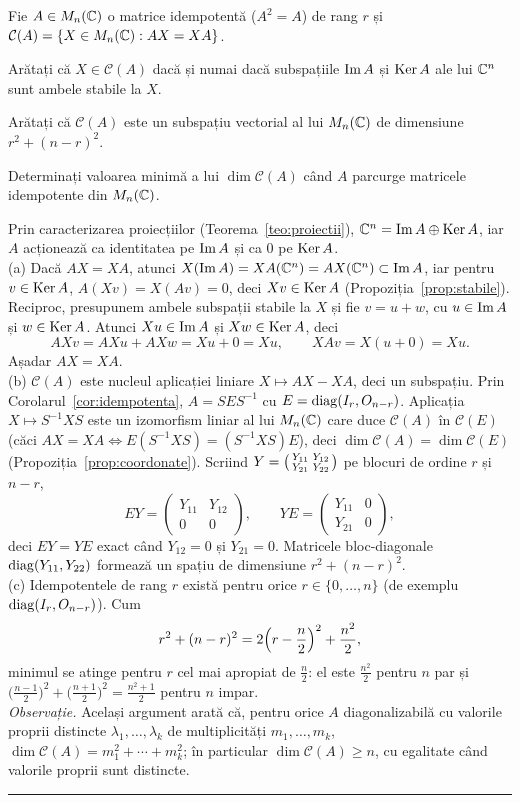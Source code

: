 Fie $A\in M_n(\mathbb{C})$ o matrice idempotentă ($A^2=A$) de rang $r$ și $\mathcal{C}(A)=\{X\in M_n(\mathbb{C}): AX=XA\}$.
\begin{parti}
  \item Arătați că $X\in\mathcal{C}(A)$ dacă și numai dacă subspațiile $\operatorname{Im} A$ și $\operatorname{Ker} A$ ale lui $\mathbb{C}^n$ sunt ambele stabile la $X$.
  \item Arătați că $\mathcal{C}(A)$ este un subspațiu vectorial al lui $M_n(\mathbb{C})$ de dimensiune $r^2+(n-r)^2$.
  \item Determinați valoarea minimă a lui $\dim\mathcal{C}(A)$ când $A$ parcurge matricele idempotente din $M_n(\mathbb{C})$.
\end{parti}
\sol Prin caracterizarea proiecțiilor (Teorema~\ref{teo:proiectii}), $\mathbb{C}^n=\operatorname{Im} A\oplus\operatorname{Ker} A$, iar $A$ acționează ca identitatea pe $\operatorname{Im} A$ și ca $0$ pe $\operatorname{Ker} A$.\\[2pt]
(a) Dacă $AX=XA$, atunci $X(\operatorname{Im} A)=X A(\mathbb{C}^n)=AX(\mathbb{C}^n)\subset\operatorname{Im} A$, iar pentru $v\in\operatorname{Ker} A$, $A(Xv)=X(Av)=0$, deci $Xv\in\operatorname{Ker} A$ (Propoziția~\ref{prop:stabile}). Reciproc, presupunem ambele subspații stabile la $X$ și fie $v=u+w$, cu $u\in\operatorname{Im} A$ și $w\in\operatorname{Ker} A$. Atunci $Xu\in\operatorname{Im} A$ și $Xw\in\operatorname{Ker} A$, deci
\[ AXv=AXu+AXw=Xu+0=Xu,\qquad XAv=X(u+0)=Xu . \]
Așadar $AX=XA$.\\[2pt]
(b) $\mathcal{C}(A)$ este nucleul aplicației liniare $X\mapsto AX-XA$, deci un subspațiu. Prin Corolarul~\ref{cor:idempotenta}, $A=SES^{-1}$ cu $E=\operatorname{diag}(I_r,O_{n-r})$. Aplicația $X\mapsto S^{-1}XS$ este un izomorfism liniar al lui $M_n(\mathbb{C})$ care duce $\mathcal{C}(A)$ în $\mathcal{C}(E)$ (căci $AX=XA\iff E(S^{-1}XS)=(S^{-1}XS)E$), deci $\dim\mathcal{C}(A)=\dim\mathcal{C}(E)$ (Propoziția~\ref{prop:coordonate}). Scriind $Y=\begin{psmallmatrix}Y_{11}&Y_{12}\\Y_{21}&Y_{22}\end{psmallmatrix}$ pe blocuri de ordine $r$ și $n-r$,
\[ EY=\begin{pmatrix}Y_{11}&Y_{12}\\0&0\end{pmatrix},\qquad YE=\begin{pmatrix}Y_{11}&0\\Y_{21}&0\end{pmatrix}, \]
deci $EY=YE$ exact când $Y_{12}=0$ și $Y_{21}=0$. Matricele bloc-diagonale $\operatorname{diag}(Y_{11},Y_{22})$ formează un spațiu de dimensiune $r^2+(n-r)^2$.\\[2pt]
(c) Idempotentele de rang $r$ există pentru orice $r\in\{0,\dots,n\}$ (de exemplu $\operatorname{diag}(I_r,O_{n-r})$). Cum
\[ r^2+(n-r)^2=2\Bigl(r-\frac n2\Bigr)^2+\frac{n^2}2, \]
minimul se atinge pentru $r$ cel mai apropiat de $\frac n2$: el este $\frac{n^2}2$ pentru $n$ par și $\bigl(\frac{n-1}2\bigr)^2+\bigl(\frac{n+1}2\bigr)^2=\frac{n^2+1}2$ pentru $n$ impar.\\[2pt]
\emph{Observație.} Același argument arată că, pentru orice $A$ diagonalizabilă cu valorile proprii distincte $\lambda_1,\dots,\lambda_k$ de multiplicități $m_1,\dots,m_k$, $\dim\mathcal{C}(A)=m_1^2+\cdots+m_k^2$; în particular $\dim\mathcal{C}(A)\ge n$, cu egalitate când valorile proprii sunt distincte.
\vspace{1mm}\hrule

